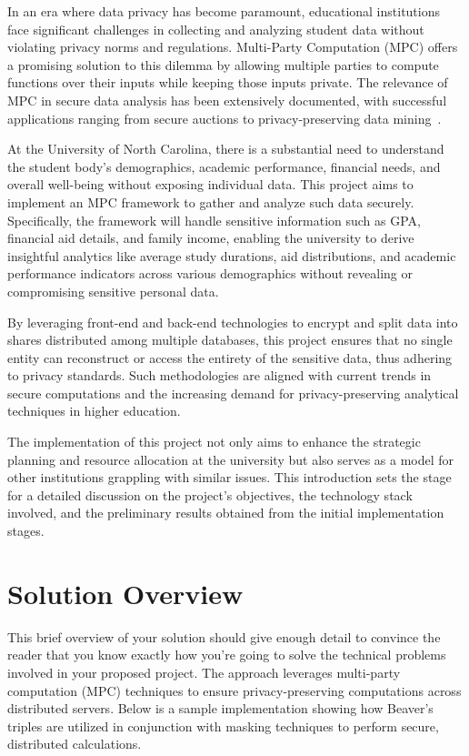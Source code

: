 \documentclass[conference]{IEEEtran}
\begin{document}
In an era where data privacy has become paramount, educational institutions face significant challenges in collecting and analyzing student data without violating privacy norms and regulations. Multi-Party Computation (MPC) offers a promising solution to this dilemma by allowing multiple parties to compute functions over their inputs while keeping those inputs private. The relevance of MPC in secure data analysis has been extensively documented, with successful applications ranging from secure auctions to privacy-preserving data mining~\cite{MPC1}.

At the University of North Carolina, there is a substantial need to understand the student body's demographics, academic performance, financial needs, and overall well-being without exposing individual data. This project aims to implement an MPC framework to gather and analyze such data securely. Specifically, the framework will handle sensitive information such as GPA, financial aid details, and family income, enabling the university to derive insightful analytics like average study durations, aid distributions, and academic performance indicators across various demographics without revealing or compromising sensitive personal data.

By leveraging front-end and back-end technologies to encrypt and split data into shares distributed among multiple databases, this project ensures that no single entity can reconstruct or access the entirety of the sensitive data, thus adhering to privacy standards. Such methodologies are aligned with current trends in secure computations and the increasing demand for privacy-preserving analytical techniques in higher education.

The implementation of this project not only aims to enhance the strategic planning and resource allocation at the university but also serves as a model for other institutions grappling with similar issues. This introduction sets the stage for a detailed discussion on the project's objectives, the technology stack involved, and the preliminary results obtained from the initial implementation stages.

\section{Solution Overview}

This brief overview of your solution should give enough detail to convince the reader that you know exactly how you're going to solve the technical problems involved in your proposed project. The approach leverages multi-party computation (MPC) techniques to ensure privacy-preserving computations across distributed servers. Below is a sample implementation showing how Beaver's triples are utilized in conjunction with masking techniques to perform secure, distributed calculations.
\end{document}
